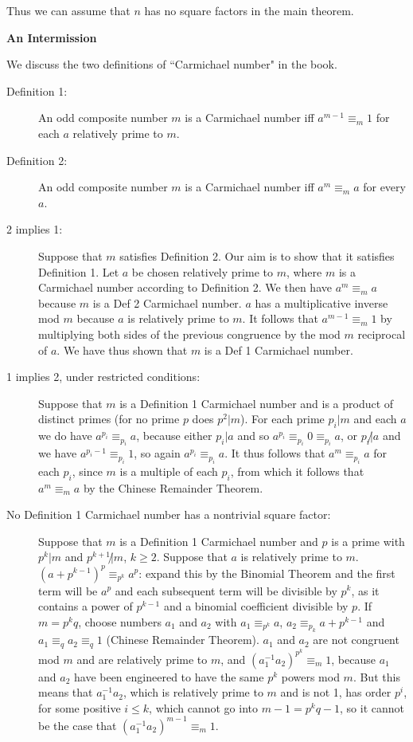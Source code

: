 \documentclass[12pt]{article}
\begin{document}
Thus we can assume that $n$ has no square factors in the main theorem.

{\bf An Intermission}

We discuss the two definitions of ``Carmichael number" in the book.

\begin{description}

\item[Definition 1:]  An odd composite number $m$ is a Carmichael number iff $a^{m-1} \equiv_m 1$ for each $a$ relatively prime to $m$.

\item[Definition 2:]  An odd composite number $m$ is a Carmichael number iff $a^m \equiv_m a$ for every $a$.

\item[2 implies 1:]  Suppose that $m$ satisfies Definition 2.  Our aim is to show that it satisfies Definition 1.  Let $a$ be chosen relatively prime to $m$, where $m$ is a Carmichael number according to Definition 2.  We then have $a^m \equiv_m a$ because $m$ is a Def 2 Carmichael number.  $a$ has a multiplicative inverse mod $m$ because $a$ is relatively prime to $m$.
It follows that $a^{m-1} \equiv_m 1$ by multiplying both sides of the previous congruence by the mod $m$ reciprocal of $a$.  We have thus shown that $m$ is a Def 1 Carmichael number.

\item[1 implies 2, under restricted conditions:]  Suppose that $m$ is a Definition 1 Carmichael number and is a product of distinct primes (for no prime $p$ does $p^2|m$).
For each prime $p_i |m$ and each $a$ we do have $a^{p_i}\equiv_{p_i} a$, because either $p_i |a$ and so $a^{p_i} \equiv_{p_i} 0 \equiv_{p_i} a$, or $p_i \not| a$ and we have $a^{p_i-1}\equiv_{p_i} 1$, so again $a^{p_i}\equiv_{p_i} a$.  It thus follows that $a^m \equiv_{p_i} a$ for each $p_i$, since $m$ is a multiple of each $p_i$, from which it follows
that $a^m \equiv_m a$ by the Chinese Remainder Theorem.

\item[No Definition 1 Carmichael number has a nontrivial square factor:]  Suppose that $m$ is a Definition 1 Carmichael number and $p$ is a prime with $p^k | m$ and $p^{k+1}\not|m$, $k \geq 2$.  Suppose that
$a$ is relatively prime to $m$.   $(a+p^{k-1})^p \equiv_{p^k} a^p$:  expand this by the Binomial Theorem and the first term will be $a^p$ and each subsequent term will be divisible by $p^k$,
as it contains a power of $p^{k-1}$ and a binomial coefficient divisible by $p$.   If $m=p^kq$, choose numbers $a_1$ and $a_2$ with $a_1 \equiv_{p^k} a$, $a_2 \equiv_{p_k} a+p^{k-1}$
and $a_1 \equiv_q a_2 \equiv_q 1$ (Chinese Remainder Theorem).  $a_1$ and $a_2$ are not congruent mod $m$ and are relatively prime to $m$, and $(a_1^{-1}a_2)^{p^k} \equiv_m 1$,
because $a_1$ and $a_2$ have been engineered to have the same $p^k$ powers mod $m$.  But this means that $a_1^{-1}a_2$, which is relatively prime to $m$ and is not 1, has order 
$p^i$, for some positive $i \leq k$, which cannot go into $m-1=p^kq-1$, so it cannot be the case that $(a_1^{-1}a_2)^{m-1} \equiv_m 1$.

\end{description}
\end{document}
